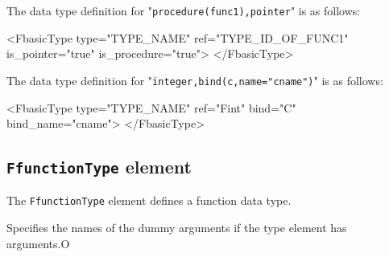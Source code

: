 The data type definition for "{\tt procedure(func1),pointer}" is as follows:
\vspace{2mm}

\begin{XcodeMLFExample}
<FbasicType type="TYPE_NAME" ref="TYPE_ID_OF_FUNC1" is_pointer="true"
 is_procedure="true">
</FbasicType>
\end{XcodeMLFExample}

The data type definition for "{\tt integer,bind(c,name="cname")}" is as follows:
\vspace{2mm}

\begin{XcodeMLFExample}
<FbasicType type="TYPE_NAME" ref="Fint" bind="C" bind_name="cname">
</FbasicType>
\end{XcodeMLFExample}


\subsection{ {\tt FfunctionType} element}

The {\tt FfunctionType} element defines a function data type.


\begin{XcodeMLChildElements}
{Specifies the names of the dummy arguments if the type element has arguments.}{O}
\end{XcodeMLChildElements}

